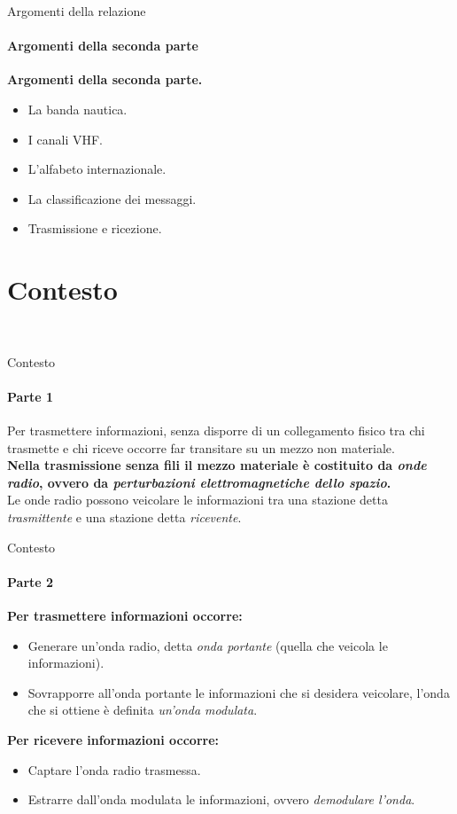 \documentclass[aspectratio=169]{beamer}
\begin{document}
	\begin{frame}{Argomenti della relazione}
		\framesubtitle{Argomenti della seconda parte}
		\textbf{Argomenti della seconda parte.}
		\begin{itemize}
			\item La banda nautica.
			\item I canali VHF.
			\item L'alfabeto internazionale. 
			\item La classificazione dei messaggi. 
			\item Trasmissione e ricezione.
		\end{itemize}
	\end{frame}

	\section{Contesto}
	\begin{frame}
		\\
	\end{frame}

	\begin{frame}{Contesto}
		\framesubtitle{Parte 1}
		Per trasmettere informazioni, senza disporre di un collegamento fisico tra chi trasmette e chi riceve occorre far transitare su un mezzo non materiale.\\
		\bigskip
		\textbf{Nella trasmissione senza fili il mezzo materiale è costituito da \emph{onde radio}, ovvero da \emph{perturbazioni elettromagnetiche dello spazio}.}\\
		\bigskip
		Le onde radio possono veicolare le informazioni tra una stazione detta \emph{trasmittente} e una stazione detta \emph{ricevente}.\\
	\end{frame}

	\begin{frame}{Contesto}
		\framesubtitle{Parte 2}
			\textbf{Per trasmettere informazioni occorre:}\\
		\begin{itemize}
			\item Generare un'onda radio, detta \emph{onda portante} (quella che veicola le informazioni).
			\item Sovrapporre all'onda portante le informazioni che si desidera veicolare, l'onda che si ottiene è definita \emph{un'onda modulata}.
		\end{itemize} 
		\bigskip
		\textbf{Per ricevere informazioni occorre:}
		\begin{itemize}
			\item Captare l'onda radio trasmessa.
			\item Estrarre dall'onda modulata le informazioni, ovvero \emph{demodulare l'onda}.
		\end{itemize}
	\end{frame}
\end{document}
